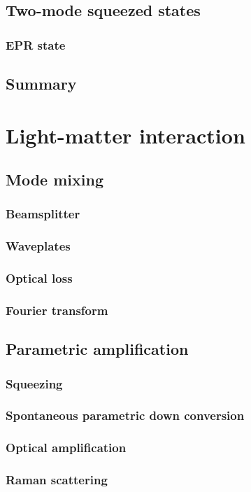\documentclass{book}
\begin{document}
\section{Two-mode squeezed states}
\subsection{EPR state}
\section{Summary}

\chapter{Light-matter interaction}
\section{Mode mixing}
\subsection{Beamsplitter}
\subsection{Waveplates}
\subsection{Optical loss}
\subsection{Fourier transform}
\section{Parametric amplification}
\subsection{Squeezing}
\subsection{Spontaneous parametric down conversion}
\subsection{Optical amplification}
\subsection{Raman scattering}
\end{document}
